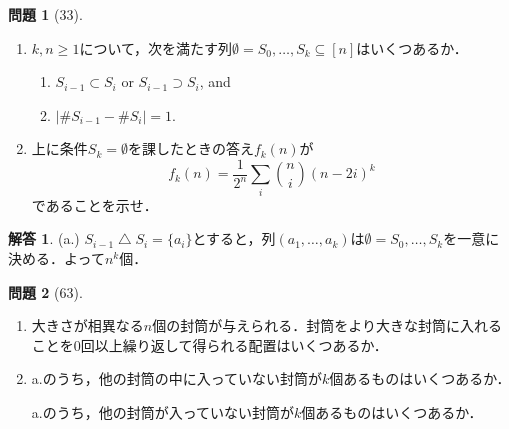 \documentclass[xelatex,ja=standard,a4paper,14pt,everyparhook=compat]{bxjsarticle}
\theoremstyle{definition}
\newtheorem*{problem}{問題}
\newtheorem*{answer}{解答}
\begin{document}
\begin{problem}[33]
\begin{enumerate}
    \item $k, n \geq 1$について，次を満たす列$\emptyset = S_0,\ldots,S_k \subseteq [n]$はいくつあるか．\begin{enumerate}[label=(\roman*)]
              \item $S_{i-1} \subset S_i$ or $S_{i-1} \supset S_i$, and
              \item $|\#S_{i-1} - \#S_i| = 1$.
          \end{enumerate}
    \item 上に条件$S_k = \emptyset$を課したときの答え$f_k(n)$が \begin{equation*}
              f_k(n) = \frac{1}{2^n} \sum_i \binom{n}{i} (n-2i)^k
          \end{equation*}
          であることを示せ．
\end{enumerate}
\end{problem}
\begin{answer}
    (a.) $S_{i-1} \mathbin{\triangle} S_i = \{a_i\}$とすると，列$(a_1,\ldots,a_k)$は$\emptyset = S_0,\ldots,S_k$を一意に決める．よって$n^k$個．
\end{answer}

\begin{problem}[63]
\begin{enumerate}
    \item 大きさが相異なる$n$個の封筒が与えられる．封筒をより大きな封筒に入れることを$0$回以上繰り返して得られる配置はいくつあるか．
    \item a.のうち，他の封筒の中に入っていない封筒が$k$個あるものはいくつあるか．

          a.のうち，他の封筒が入っていない封筒が$k$個あるものはいくつあるか．
\end{enumerate}
\end{problem}
\end{document}
